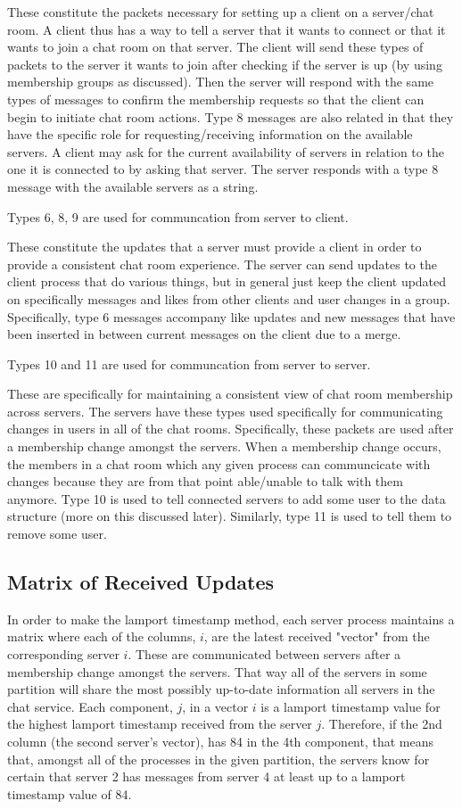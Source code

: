 \documentclass[12pt,journal,compsoc]{IEEEtran}
\begin{document}
These constitute the packets necessary for setting up a client on a server/chat room. A client thus has a way to tell a server that it wants to connect or that it wants to join a chat room on that server. The client will send these types of packets to the server it wants to join after checking if the server is up (by using membership groups as discussed). Then the server will respond with the same types of messages to confirm the membership requests so that the client can begin to initiate chat room actions. Type 8 messages are also related in that they have the specific role for requesting/receiving information on the available servers. A client may ask for the current availability of servers in relation to the one it is connected to by asking that server. The server responds with a type 8 message with the available servers as a string.

Types 6, 8, 9 are used for communcation from server to client.

These constitute the updates that a server must provide a client in order to provide a consistent chat room experience. The server can send updates to the client process that do various things, but in general just keep the client updated on specifically messages and likes from other clients and user changes in a group. Specifically, type 6 messages accompany like updates and new messages that have been inserted in between current messages on the client due to a merge.

Types 10 and 11 are used for communcation from server to server.

These are specifically for maintaining a consistent view of chat room membership across servers. The servers have these types used specifically for communicating changes in users in all of the chat rooms. Specifically, these packets are used after a membership change amongst the servers. When a membership change occurs, the members in a chat room which any given process can communcicate with changes because they are from that point able/unable to talk with them anymore. Type 10 is used to tell connected servers to add some user to the data structure (more on this discussed later). Similarly, type 11 is used to tell them to remove some user.

\subsection{Matrix of Received Updates}

In order to make the lamport timestamp method, each server process maintains a matrix where each of the columns, $i$, are the latest received "vector" from the corresponding server $i$. These are communicated between servers after a membership change amongst the servers. That way all of the servers in some partition will share the most possibly up-to-date information all servers in the chat service. Each component, $j$, in a vector $i$ is a lamport timestamp value for the highest lamport timestamp received from the server $j$. Therefore, if the 2nd column (the second server's vector), has 84 in the 4th component, that means that, amongst all of the processes in the given partition, the servers know for certain that server 2 has messages from server 4 at least up to a lamport timestamp value of 84.
\end{document}
